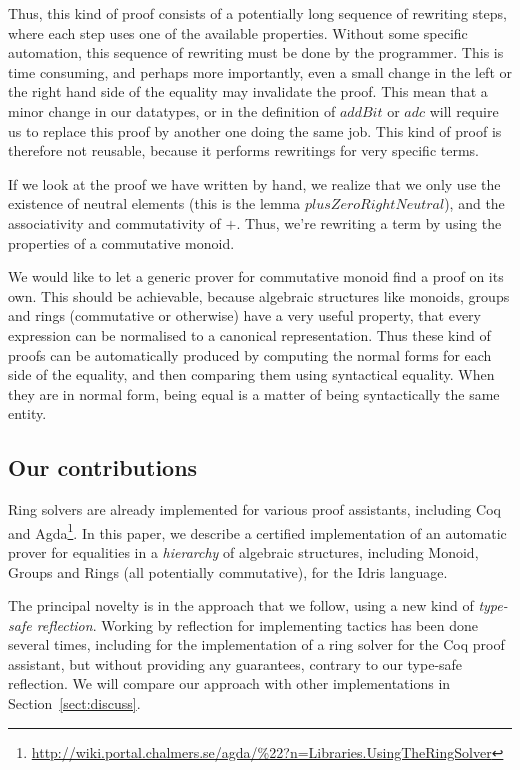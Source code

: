 Thus, this kind of proof consists of a potentially long sequence of rewriting
steps,
where each step uses one of the available properties. Without some
specific automation, this sequence of rewriting must be done by the programmer.
This is time consuming, and perhaps more importantly, even a small
change in the left
or the right hand side of the equality may invalidate the proof.
This mean that a minor change in our
datatypes, or in the definition of $addBit$ or $adc$ will require us to
replace this proof by another one doing the same job.
This kind
of proof is therefore not reusable, because it performs rewritings for
very specific terms.

If we look at the proof we have written by hand, we realize that we only use
the existence of neutral elements (this is the lemma $plusZeroRightNeutral$),
and the associativity and commutativity of $+$. Thus, we're rewriting a term by
using the properties of a commutative monoid.

We would like to let a generic prover for commutative monoid find a proof on its own.
This should be achievable, because algebraic structures like monoids, groups and
rings (commutative or otherwise) have a very useful property, that
every expression can be normalised to a canonical representation. Thus
these kind of proofs can be automatically produced by computing the
normal forms for each side of the equality, and then comparing them using
syntactical equality. When they are in normal
form, being equal is a matter of being syntactically the same entity.

\subsection{Our contributions}

Ring solvers are already implemented for various proof
assistants, including Coq~\cite{Coq2005} and Agda\footnote{\url{http://wiki.portal.chalmers.se/agda/\%22?n=Libraries.UsingTheRingSolver}}. 
In this paper, we describe a certified
implementation of an automatic prover for equalities in a
\emph{hierarchy} of algebraic
structures, including Monoid, Groups and Rings (all potentially commutative),
for the Idris language. 

The principal novelty is in the approach that we follow, using a
new kind of \emph{type-safe reflection}.  Working by reflection for implementing
tactics has been done several times, including for the implementation of a
ring solver for the Coq proof assistant, but without
providing any guarantees, contrary to our type-safe reflection. We will
compare our approach with other implementations in Section~\ref{sect:discuss}.

